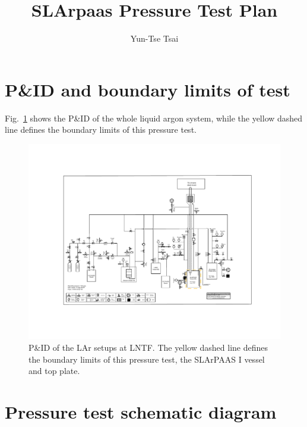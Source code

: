 \documentclass[letterpaper,11pt]{article}
\title{SLArpaas Pressure Test Plan}
\author{Yun-Tse Tsai}
\begin{document}
\maketitle
\tableofcontents


\section{P\&ID and boundary limits of test}

Fig.~\ref{fig:PID} shows the P\&ID of the whole liquid argon system, 
while the yellow dashed line defines the boundary limits of this
pressure test.

\begin{figure}[h]
    \centering
    \includegraphics[width=\textwidth]{fig/PID_SLArchettoPAAS_v9.5_PressureTest.pdf}
    \caption{P\&ID of the LAr setups at LNTF.  The yellow dashed line defines the boundary
    limits of this pressure test, the SLArPAAS I vessel and top plate.}
    \label{fig:PID}
\end{figure}

\section{Pressure test schematic diagram}
\end{document}
